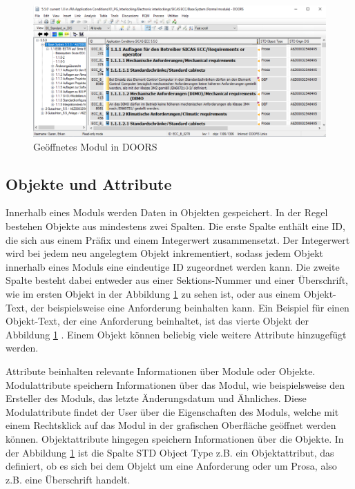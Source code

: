 \begin{figure}[h]
    \centering
    \includegraphics[width = \textwidth]{abbildungen/Modul in Doors.PNG}
    \caption{Geöffnetes Modul in \acs{DOORS}}
    \label{fig:Modul Doors}
\end{figure}

\subsection{Objekte und Attribute}
Innerhalb eines Moduls werden Daten in Objekten gespeichert. In der Regel bestehen Objekte aus mindestens zwei Spalten. Die erste 
Spalte enthält eine ID, die sich aus einem Präfix und einem Integerwert zusammensetzt. Der Integerwert wird bei jedem neu angelegtem 
Objekt inkrementiert, sodass jedem Objekt innerhalb eines Moduls eine eindeutige ID zugeordnet werden kann.
Die zweite Spalte besteht dabei entweder aus einer Sektions-Nummer und einer Überschrift, wie im ersten Objekt in der Abbildung 
\ref*{fig:Modul Doors} zu sehen ist, oder aus einem Objekt-Text, der beispielsweise eine Anforderung beinhalten kann. Ein Beispiel für 
einen Objekt-Text, der eine Anforderung beinhaltet, ist das vierte Objekt der Abbildung \ref*{fig:Modul Doors} \cite[vgl. S.178]{DOORS}.
Einem Objekt können beliebig viele weitere Attribute hinzugefügt werden. 

Attribute beinhalten relevante Informationen über Module oder Objekte. Modulattribute speichern Informationen über das Modul, wie beispielsweise
den Ersteller des Moduls, das letzte Änderungsdatum und Ähnliches. Diese Modulattribute findet der User über die Eigenschaften des Moduls, 
welche mit einem Rechtsklick auf das Modul in der grafischen Oberfläche geöffnet werden können. Objektattribute hingegen
speichern Informationen über die Objekte. In der Abbildung \ref*{fig:Modul Doors} ist die Spalte STD Object Type z.B. ein Objektattribut,
das definiert, ob es sich bei dem Objekt um eine Anforderung oder um Prosa, also z.B. eine Überschrift handelt.


